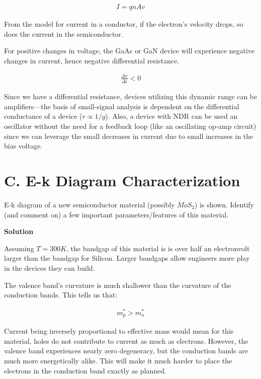 \documentclass{article}
\begin{document}
\begin{align*}
    I = q n A v
\end{align*}

From the model for current in a conductor, if the electron's velocity drops, so does the current in the semiconductor.

\smallskip

For positive changes in voltage, the GaAs or GaN device will experience negative changes in current, hence negative differential resistance. 

\begin{align*}
    \frac{\Delta v}{\Delta i} < 0
\end{align*}

Since we have a differential resistance, devices utilizing this dynamic range can be amplifiers---the basis of small-signal analysis is dependent on the differential conductance of a device (\(r \propto 1/g\)). Also, a device with NDR can be used an oscillator without the need for a feedback loop (like an oscillating op-amp circuit) since we can leverage the small decreases in current due to small increases in the bias voltage.


\section*{C. E-k Diagram Characterization}

E-k diagram of a new semiconductor material (possibly \(MoS_2\)) is shown. Identify (and comment on) a few important parameters/features of this material.

\bigskip

\textbf{Solution}

Assuming \(T = 300 K\), the bandgap of this material is is over half an electronvolt larger than the bandgap for Silicon. Larger bandgaps allow engineers more play in the devices they can build. 

\smallskip

The valence band's curvature is much shallower than the curvature of the conduction bands. This tells us that:

\begin{align*}
    m^*_p > m^*_n
\end{align*}

Current being inversely proportional to effective mass would mean for this material, holes do not contribute to current as much as electrons.
However, the valence band experiences nearly zero degeneracy, but the conduction bands are much more energetically alike. This will make it much harder to place the electrons in the conduction band exactly as planned.
\end{document}
